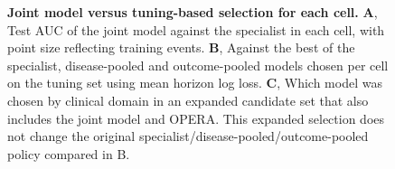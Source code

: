 
\begin{figure}[p]
  \caption{\textbf{Joint model versus tuning-based selection for each cell.}
  \textbf{A}, Test AUC of the joint model against the specialist in each cell, with point size reflecting training events. \textbf{B}, Against the best of
  the specialist, disease-pooled and outcome-pooled models chosen per cell on
  the tuning set using mean horizon log loss. \textbf{C}, Which model was
  chosen by clinical domain in an expanded candidate set that also includes
  the joint model and OPERA. This expanded selection does not change the
  original specialist/disease-pooled/outcome-pooled policy compared in B.}
  \label{fig:strategy}
\end{figure}

